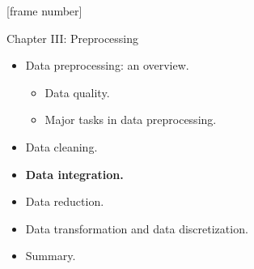 \documentclass[aspectratio=169,t]{beamer}
\begin{document}
  {
    [frame number]
    \begin{frame}{Chapter III: Preprocessing}
        \begin{itemize}
            \item Data preprocessing: an overview.
            \begin{itemize}
              \item Data quality.
              \item Major tasks in data preprocessing.
            \end{itemize}
            \item Data cleaning.
            \item \textbf{Data integration.}
            \item Data reduction.
            \item Data transformation and data discretization.
            \item Summary.
        \end{itemize}
    \end{frame}
  }
\end{document}
